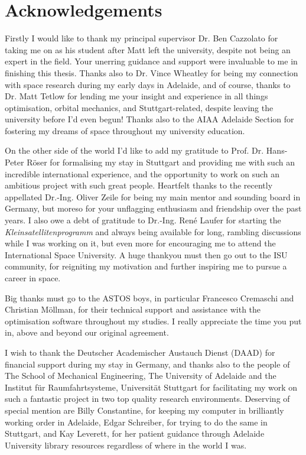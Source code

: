 \chapter*{Acknowledgements}

Firstly I would like to thank my principal supervisor Dr. Ben Cazzolato for taking me on as his student after Matt left the university, despite not being an expert in the field. Your unerring guidance and support were invaluable to me in finishing this thesis. Thanks also to Dr. Vince Wheatley for being my connection with space research during my early days in Adelaide, and of course, thanks to Dr. Matt Tetlow for lending me your insight and experience in all things optimisation, orbital mechanics, and Stuttgart-related, despite leaving the university before I'd even begun! Thanks also to the AIAA Adelaide Section for fostering my dreams of space throughout my university education.

On the other side of the world I'd like to add my gratitude to Prof. Dr. Hans-Peter R\"{o}ser for formalising my stay in Stuttgart and providing me with such an incredible international experience, and the opportunity to work on such an ambitious project with such great people. Heartfelt thanks to the recently appellated Dr.-Ing. Oliver Zeile for being my main mentor and sounding board in Germany, but moreso for your unflagging enthusiasm and friendship over the past years. I also owe a debt of gratitude to Dr.-Ing. Ren\'{e} Laufer for starting the \emph{Kleinsatellitenprogramm} and always being available for long, rambling discussions while I was working on it, but even more for encouraging me to attend the International Space University. A huge thankyou must then go out to the ISU community, for reigniting my motivation and further inspiring me to pursue a career in space.

Big thanks must go to the ASTOS boys, in particular Francesco Cremaschi and Christian M\"{o}llman, for their technical support and assistance with the optimisation software throughout my studies. I really appreciate the time you put in, above and beyond our original agreement.

I wish to thank the Deutscher Academischer Austauch Dienst (DAAD) for financial support during my stay in Germany, and thanks also to the people of The School of Mechanical Engineering, The University of Adelaide and the Institut f\"{u}r Raumfahrtsysteme, Universit\"{a}t Stuttgart for facilitating my work on such a fantastic project in two top quality research environments. Deserving of special mention are Billy Constantine, for keeping my computer in brilliantly working order in Adelaide, Edgar Schreiber, for trying to do the same in Stuttgart, and Kay Leverett, for her patient guidance through Adelaide University library resources regardless of where in the world I was.


